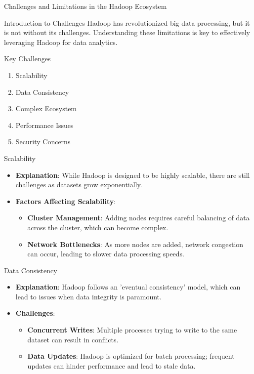\documentclass[aspectratio=169]{beamer}
\begin{document}
\begin{frame}[fragile]{Challenges and Limitations in the Hadoop Ecosystem}
    \begin{block}{Introduction to Challenges}
        Hadoop has revolutionized big data processing, but it is not without its challenges. Understanding these limitations is key to effectively leveraging Hadoop for data analytics.
    \end{block}
\end{frame}

\begin{frame}[fragile]{Key Challenges}
    \begin{enumerate}
        \item Scalability
        \item Data Consistency
        \item Complex Ecosystem
        \item Performance Issues
        \item Security Concerns
    \end{enumerate}
\end{frame}

\begin{frame}[fragile]{Scalability}
    \begin{itemize}
        \item \textbf{Explanation}: While Hadoop is designed to be highly scalable, there are still challenges as datasets grow exponentially.
        \item \textbf{Factors Affecting Scalability}:
        \begin{itemize}
            \item \textbf{Cluster Management}: Adding nodes requires careful balancing of data across the cluster, which can become complex.
            \item \textbf{Network Bottlenecks}: As more nodes are added, network congestion can occur, leading to slower data processing speeds.
        \end{itemize}
    \end{itemize}
\end{frame}

\begin{frame}[fragile]{Data Consistency}
    \begin{itemize}
        \item \textbf{Explanation}: Hadoop follows an 'eventual consistency' model, which can lead to issues when data integrity is paramount.
        \item \textbf{Challenges}:
        \begin{itemize}
            \item \textbf{Concurrent Writes}: Multiple processes trying to write to the same dataset can result in conflicts.
            \item \textbf{Data Updates}: Hadoop is optimized for batch processing; frequent updates can hinder performance and lead to stale data.
        \end{itemize}
    \end{itemize}
\end{frame}
\end{document}
